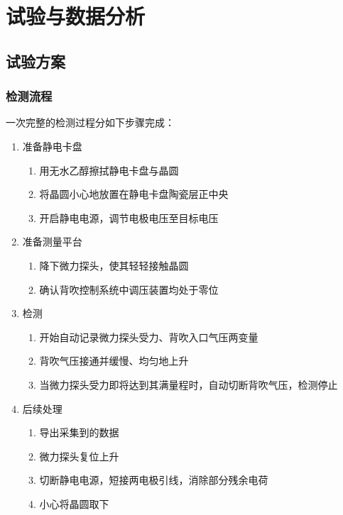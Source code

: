 \chapter{试验与数据分析}\label{ch:exp}




\section{试验方案}


\subsection{检测流程}\label{sec:rig-overall-proc}

一次完整的检测过程分如下步骤完成：

\begin{enumerate}
  \item 准备静电卡盘
  \begin{enumerate}
    \item 用无水乙醇擦拭静电卡盘与晶圆
    \item 将晶圆小心地放置在静电卡盘陶瓷层正中央
    \item 开启静电电源，调节电极电压至目标电压
  \end{enumerate}
  
  \item 准备测量平台
  \begin{enumerate}
    \item 降下微力探头，使其轻轻接触晶圆
    \item 确认背吹控制系统中调压装置均处于零位
  \end{enumerate}
  
  \item 检测
  \begin{enumerate}
    \item 开始自动记录微力探头受力、背吹入口气压两变量
    \item 背吹气压接通并缓慢、均匀地上升
    \item 当微力探头受力即将达到其满量程时，自动切断背吹气压，检测停止
  \end{enumerate}
  
  \item 后续处理
  \begin{enumerate}
    \item 导出采集到的数据
    \item 微力探头复位上升
    \item 切断静电电源，短接两电极引线，消除部分残余电荷
    \item 小心将晶圆取下
  \end{enumerate}
\end{enumerate}